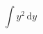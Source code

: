 \documentclass[border=2pt,varwidth=true]{standalone}
\begin{document}
\begin{displaymath}
\int y^2 \, \mathrm{d}y
\end{displaymath}
\end{document}
